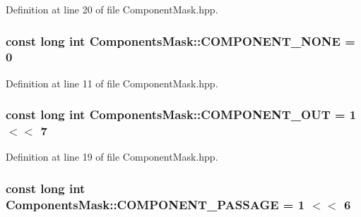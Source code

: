 Definition at line 20 of file Component\+Mask.\+hpp.

\hypertarget{class_components_mask_a65df1295d217a6d29d7221447fe06da5}{
\subsubsection[{C\+O\+M\+P\+O\+N\+E\+N\+T\+\_\+\+N\+O\+N\+E}]{\setlength{\rightskip}{0pt plus 5cm}const long int Components\+Mask\+::\+C\+O\+M\+P\+O\+N\+E\+N\+T\+\_\+\+N\+O\+N\+E = 0\hspace{0.3cm}{\ttfamily [static]}}}\label{class_components_mask_a65df1295d217a6d29d7221447fe06da5}


Definition at line 11 of file Component\+Mask.\+hpp.

\hypertarget{class_components_mask_ab28458934af33cdf7d3c8e128c4da866}{
\subsubsection[{C\+O\+M\+P\+O\+N\+E\+N\+T\+\_\+\+O\+U\+T}]{\setlength{\rightskip}{0pt plus 5cm}const long int Components\+Mask\+::\+C\+O\+M\+P\+O\+N\+E\+N\+T\+\_\+\+O\+U\+T = 1 $<$$<$ 7\hspace{0.3cm}{\ttfamily [static]}}}\label{class_components_mask_ab28458934af33cdf7d3c8e128c4da866}


Definition at line 19 of file Component\+Mask.\+hpp.

\hypertarget{class_components_mask_a9686a00bbefcd13f5fab9780446733c1}{
\subsubsection[{C\+O\+M\+P\+O\+N\+E\+N\+T\+\_\+\+P\+A\+S\+S\+A\+G\+E}]{\setlength{\rightskip}{0pt plus 5cm}const long int Components\+Mask\+::\+C\+O\+M\+P\+O\+N\+E\+N\+T\+\_\+\+P\+A\+S\+S\+A\+G\+E = 1 $<$$<$ 6\hspace{0.3cm}{\ttfamily [static]}}}\label{class_components_mask_a9686a00bbefcd13f5fab9780446733c1}


